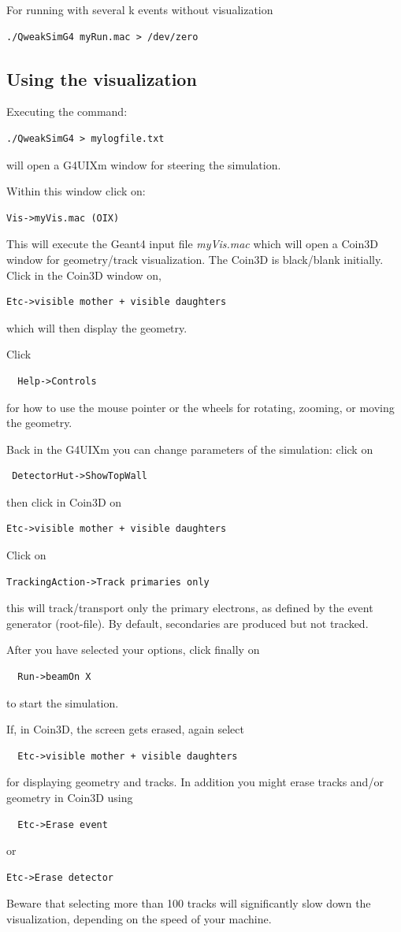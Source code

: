 For running with several k events without visualization
\begin{verbatim}
./QweakSimG4 myRun.mac > /dev/zero 
\end{verbatim}
     

\subsection{Using the visualization}
Executing  the command:
\begin{verbatim}
./QweakSimG4 > mylogfile.txt 
\end{verbatim}
will open a G4UIXm window for steering the simulation.

Within this window click on:
\begin{verbatim}
Vis->myVis.mac (OIX)
\end{verbatim}
This will execute the Geant4 input file {\em myVis.mac} which will
open a Coin3D window for geometry/track visualization.
The Coin3D is black/blank initially. Click in the Coin3D window on,
\begin{verbatim}
Etc->visible mother + visible daughters
\end{verbatim} 
which will then display the geometry.
 
Click 
\begin{verbatim}
  Help->Controls
\end{verbatim} 
for how to use the mouse pointer or the wheels for rotating, zooming, or moving the geometry.

Back in the G4UIXm you can change parameters of the simulation:
click on 
\begin{verbatim}
 DetectorHut->ShowTopWall
\end{verbatim} 
then click in Coin3D on 
\begin{verbatim}
Etc->visible mother + visible daughters
\end{verbatim} 
Click on 
\begin{verbatim}
TrackingAction->Track primaries only
\end{verbatim} 
this will track/transport only the primary electrons, as defined by
the event generator (root-file). By default, secondaries are produced 
but not tracked.
 
After you have selected your options, click finally on 
\begin{verbatim}
  Run->beamOn X
\end{verbatim} 
to start the simulation. 

If, in Coin3D, the screen gets erased, again select 
\begin{verbatim}
  Etc->visible mother + visible daughters
\end{verbatim} 
for displaying geometry and tracks.  In addition you might erase
tracks and/or geometry in Coin3D using 
\begin{verbatim}
  Etc->Erase event
\end{verbatim} 
or
\begin{verbatim}
Etc->Erase detector 
\end{verbatim}

Beware that selecting more than 100 tracks will significantly slow
down the visualization, depending on the speed of your machine.
